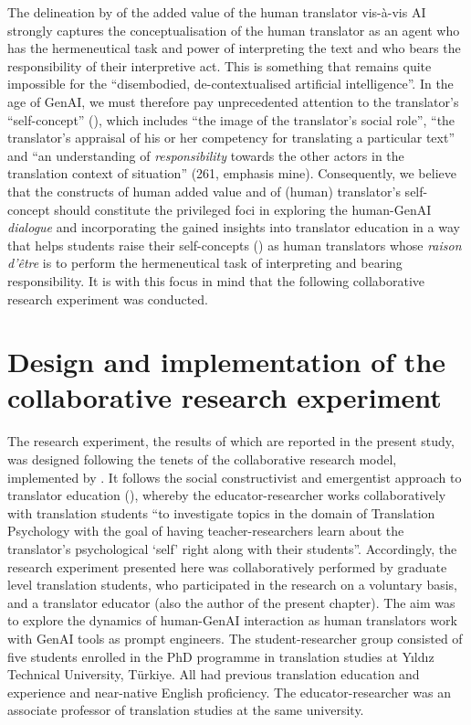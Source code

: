 \documentclass[output=paper,colorlinks,citecolor=brown]{langscibook}
\begin{document}
The delineation by \citet[39]{massey_translation_2021} of the added value of the human translator vis-à-vis AI strongly captures the conceptualisation of the human translator as an agent who has the hermeneutical task and power of interpreting the text and who bears the responsibility of their interpretive act. This is something that remains quite impossible for the “disembodied, de-contextualised artificial intelligence”. In the age of GenAI, we must therefore pay unprecedented attention to the translator’s “self-concept” (\cite{harokiraly2019}), which includes “the image of the translator’s social role”, “the translator’s appraisal of his or her competency for translating a particular text” and “an understanding of \textit{responsibility} towards the other actors in the translation context of situation” (261, emphasis mine). Consequently, we believe that the constructs of human added value and of (human) translator’s self-concept should constitute the privileged foci in exploring the human-GenAI \textit{dialogue} and incorporating the gained insights into translator education in a way that helps students raise their self-concepts (\cite[261--262]{harokiraly2019}) as human translators whose \textit{raison d’être} is to perform the hermeneutical task of interpreting and bearing responsibility. It is with this focus in mind that the following collaborative research experiment was conducted.
\section{Design and implementation of the collaborative research experiment}
The research experiment, the results of which are reported in the present study, was designed following the tenets of the collaborative research model, implemented by \citet{harokiraly2019}. It follows the social constructivist and emergentist approach to translator education (\cite[256]{kiraly_social_2000}), whereby the educator-researcher works collaboratively with translation students “to investigate topics in the domain of Translation Psychology with the goal of having teacher-researchers learn about the translator’s psychological ‘self’ right along with their students”. Accordingly, the research experiment presented here was collaboratively performed by graduate level translation students, who participated in the research on a voluntary basis, and a translator educator (also the author of the present chapter). The aim was to explore the dynamics of human-GenAI interaction as human translators work with GenAI tools as prompt engineers. The student-researcher group consisted of five students enrolled in the PhD programme in translation studies at Yıldız Technical University, Türkiye. All had previous translation education and experience and near-native English proficiency. The educator-researcher was an associate professor of translation studies at the same university.
\end{document}
